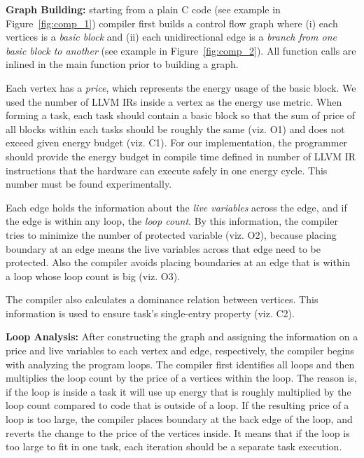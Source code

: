 \textbf{Graph Building:} starting from a plain C code (see example in Figure~\ref{fig:comp_1}) \sys compiler first builds a control flow graph where (i) each vertices is a \emph{basic block} and (ii) each unidirectional edge is a \emph{branch from one basic block to another} (see example in Figure~\ref{fig:comp_2}). All function calls are inlined in the main function prior to building a graph.

Each vertex has a {\em price}, which represents the energy usage of the basic block. We used the number of LLVM IRs inside a vertex as the energy use metric. When forming a task, each task should contain a basic block so that the sum of price of all blocks within each tasks should be roughly the same (viz. O1) and does not exceed given energy budget (viz. C1). For our implementation, the programmer should provide the energy budget in compile time defined in number of LLVM IR instructions that the hardware can execute safely in one energy cycle. This number must be found experimentally.

Each edge holds the information about the {\em live variables} across the edge, and if the edge is within any loop, the {\em loop count}. By this information, the compiler tries to minimize the number of protected variable (viz. O2), because placing boundary at an edge means the live variables across that edge need to be protected. Also the compiler avoids placing boundaries at an edge that is within a loop whose loop count is big (viz. O3).

The compiler also calculates a dominance relation  between vertices. This information is used to ensure task's single-entry property (viz. C2).

\textbf{Loop Analysis:} After constructing the graph and assigning the information on a price and live variables to each vertex and edge, respectively, the compiler begins with analyzing the program loops. The compiler first identifies all loops and then multiplies the loop count by the price of a vertices within the loop. The reason is, if the loop is inside a task it will use up energy that is roughly multiplied by the loop count compared to code that is outside of a loop. If the resulting price of a loop is too large, the compiler places boundary at the back edge of the loop, and reverts the change to the price of the vertices inside. It means that if the loop is too large to fit in one task, each iteration should be a separate task execution.

